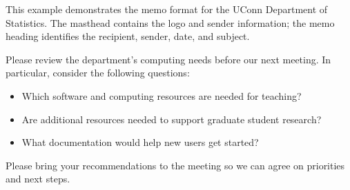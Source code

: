 \documentclass{UConnLH}
\begin{document}

This example demonstrates the memo format for the UConn Department of
Statistics. The masthead contains the logo and sender information; the
memo heading identifies the recipient, sender, date, and subject.

Please review the department's computing needs before our next meeting.
In particular, consider the following questions:

\begin{itemize}
  \item Which software and computing resources are needed for teaching?
  \item Are additional resources needed to support graduate student research?
  \item What documentation would help new users get started?
\end{itemize}

Please bring your recommendations to the meeting so we can agree on
priorities and next steps.
\end{document}
